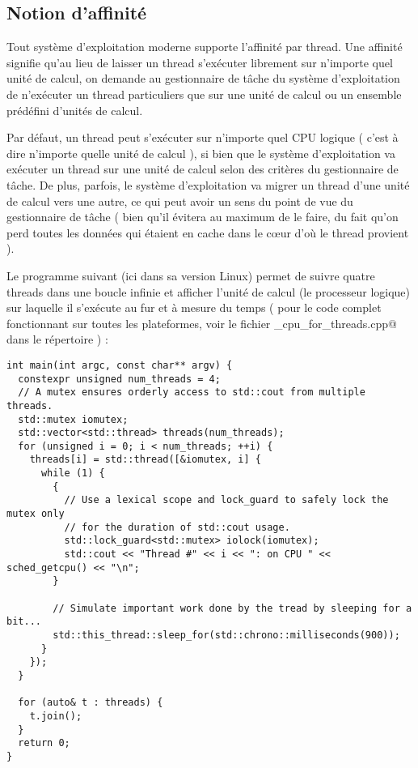 \documentclass[fleqn,11pt]{article}
\begin{document}
\subsection{Notion d'affinité}

Tout système d'exploitation moderne supporte l'affinité par thread. Une affinité signifie qu'au lieu de laisser un thread s'exécuter librement sur n'importe quel unité de calcul, on demande au gestionnaire de tâche du système d'exploitation de n'exécuter un thread particuliers que sur une unité de calcul ou un ensemble prédéfini d'unités de calcul.

Par défaut, un thread peut s'exécuter sur n'importe quel CPU logique ( c'est à dire n'importe quelle unité de calcul ), si bien que le système d'exploitation va exécuter un thread sur une unité de calcul selon des critères du gestionnaire de tâche. De plus, parfois, le système d'exploitation va migrer un thread d'une unité de calcul vers une autre, ce qui peut avoir un sens du point de vue du gestionnaire de tâche ( bien qu'il évitera au maximum de le faire, du fait qu'on perd toutes les données qui étaient en cache dans le c{\oe}ur d'où le thread provient ).

Le programme suivant (ici dans sa version Linux) permet de suivre quatre threads
dans une boucle infinie et afficher l'unité de calcul (le processeur logique) sur laquelle il s'exécute au fur et à mesure du temps ( pour le code complet fonctionnant sur toutes les plateformes, voir le fichier \verb@get_cpu_for_threads.cpp@ dans le répertoire \verb@Example@) :
\begin{lstlisting}
int main(int argc, const char** argv) {
  constexpr unsigned num_threads = 4;
  // A mutex ensures orderly access to std::cout from multiple threads.
  std::mutex iomutex;
  std::vector<std::thread> threads(num_threads);
  for (unsigned i = 0; i < num_threads; ++i) {
    threads[i] = std::thread([&iomutex, i] {
      while (1) {
        {
          // Use a lexical scope and lock_guard to safely lock the mutex only
          // for the duration of std::cout usage.
          std::lock_guard<std::mutex> iolock(iomutex);
          std::cout << "Thread #" << i << ": on CPU " << sched_getcpu() << "\n";
        }

        // Simulate important work done by the tread by sleeping for a bit...
        std::this_thread::sleep_for(std::chrono::milliseconds(900));
      }
    });
  }

  for (auto& t : threads) {
    t.join();
  }
  return 0;
}
\end{lstlisting}
\end{document}
